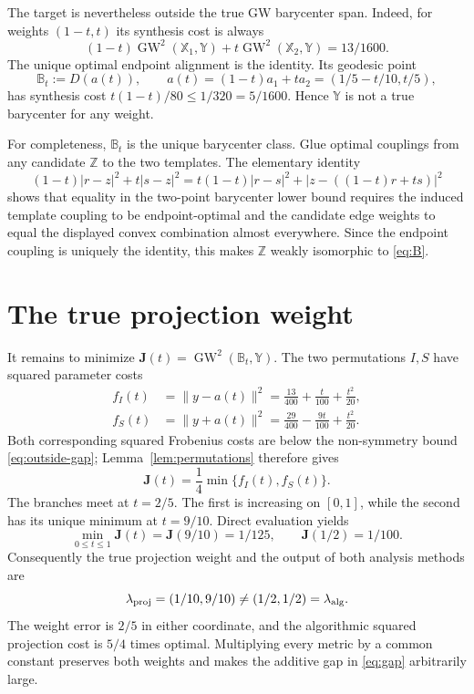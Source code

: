 \documentclass[11pt]{article}
\newcommand{\GW}{\operatorname{GW}}
\begin{document}
The target is nevertheless outside the true GW barycenter span. Indeed, for
weights $(1-t,t)$ its synthesis cost is always
\[
 (1-t)\GW^2(\mathbb X_1,\mathbb Y)
 +t\GW^2(\mathbb X_2,\mathbb Y)=13/1600.
\]
The unique optimal endpoint alignment is the identity. Its geodesic point
\begin{equation}\label{eq:B}
 \mathbb B_t:=D(a(t)),\qquad
 a(t)=(1-t)a_1+ta_2=(1/5-t/10,t/5),
\end{equation}
has synthesis cost $t(1-t)/80\leq1/320=5/1600$. Hence $\mathbb Y$ is not a
true barycenter for any weight.

For completeness, $\mathbb B_t$ is the unique barycenter class. Glue optimal
couplings from any candidate $\mathbb Z$ to the two templates. The elementary
identity
\[
 (1-t)|r-z|^2+t|s-z|^2
 =t(1-t)|r-s|^2+|z-((1-t)r+ts)|^2
\]
shows that equality in the two-point barycenter lower bound requires the
induced template coupling to be endpoint-optimal and the candidate edge
weights to equal the displayed convex combination almost everywhere. Since
the endpoint coupling is uniquely the identity, this makes $\mathbb Z$
weakly isomorphic to \eqref{eq:B}.

\section{The true projection weight}

It remains to minimize
$\mathbf J(t)=\GW^2(\mathbb B_t,\mathbb Y)$. The two permutations $I,S$
have squared parameter costs
\begin{align*}
 f_I(t)&=\|y-a(t)\|^2
       =\frac{13}{400}+\frac{t}{100}+\frac{t^2}{20},\\
 f_S(t)&=\|y+a(t)\|^2
       =\frac{29}{400}-\frac{9t}{100}+\frac{t^2}{20}.
\end{align*}
Both corresponding squared Frobenius costs are below the non-symmetry bound
\eqref{eq:outside-gap}; Lemma~\ref{lem:permutations} therefore gives
\[
 \mathbf J(t)=\frac14\min\{f_I(t),f_S(t)\}.
\]
The branches meet at $t=2/5$. The first is increasing on $[0,1]$, while the
second has its unique minimum at $t=9/10$. Direct evaluation yields
\begin{equation}\label{eq:gap}
 \min_{0\leq t\leq1}\mathbf J(t)=\mathbf J(9/10)=1/125,
 \qquad
 \mathbf J(1/2)=1/100.
\end{equation}
Consequently the true projection weight and the output of both analysis
methods are
\[
 \lambda_{\rm proj}=(1/10,9/10)\neq(1/2,1/2)=\lambda_{\rm alg}.
\]
The weight error is $2/5$ in either coordinate, and the algorithmic squared
projection cost is $5/4$ times optimal. Multiplying every metric by a common
constant preserves both weights and makes the additive gap in
\eqref{eq:gap} arbitrarily large.
\end{document}
